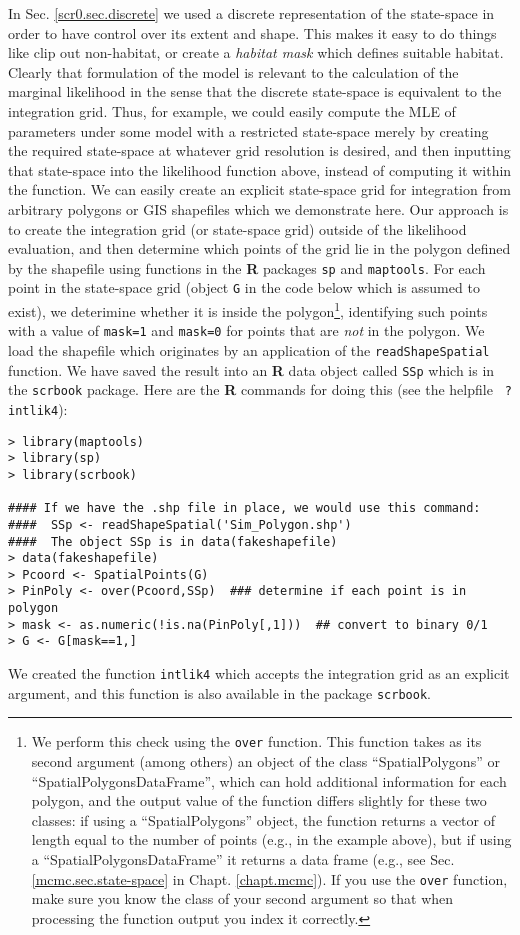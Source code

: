 In Sec. \ref{scr0.sec.discrete} we used a discrete representation of
the state-space in order to have control over its extent and
shape. This makes it easy to do things like clip out non-habitat, or
create a {\it habitat mask} which defines suitable habitat.  Clearly
that formulation of the model is relevant to the calculation of the
marginal likelihood in the sense that the discrete state-space is
equivalent to the integration grid.  Thus, for example, we could
easily compute the MLE of parameters under some model with a
restricted state-space merely by creating the required state-space at
whatever grid resolution is desired, and then inputting that
state-space into the likelihood function above, instead of computing
it within the function. We can easily create an explicit
state-space grid for integration from arbitrary polygons or GIS
shapefiles which we demonstrate here. Our approach
is to create the integration grid (or state-space grid) outside of the
likelihood evaluation, and then determine which points of the grid lie
in the polygon defined by the shapefile using functions in the {\bf R}
packages \mbox{\tt sp} and \mbox{\tt maptools}.  For each point in the
state-space grid (object \mbox{\tt G} in the code below which is
assumed to exist), we deterimine whether it is inside the
polygon\footnote{We perform this check using the {\tt over}
  function. This function takes as its second argument (among others)
  an object of the class ``SpatialPolygons'' or
  ``SpatialPolygonsDataFrame'', which can hold additional information
  for each polygon, and the output value of the function differs
  slightly for these two classes: if using a ``SpatialPolygons''
  object, the function returns a vector of length equal to the number
  of points (e.g., in the example above), but if using a
  ``SpatialPolygonsDataFrame'' it returns a data frame
  (e.g., see Sec. \ref{mcmc.sec.state-space} in
  Chapt. \ref{chapt.mcmc}). If you use the {\tt over} function, make
  sure you know the class of your second argument so that when
  processing the function output you index it correctly.}, identifying
such points with a value of \mbox{\tt mask=1} and \mbox{\tt mask=0}
for points that are {\it not} in the polygon.  We load the shapefile
which originates by an application of the \mbox{\tt readShapeSpatial}
function. We have saved the result into an {\bf R} data object called
\mbox{\tt SSp} which is in the \mbox{\tt scrbook} package.  Here are
the {\bf R} commands for doing this (see the helpfile \mbox{\tt
  ?intlik4}): {\small
\begin{verbatim}
> library(maptools)
> library(sp)
> library(scrbook)

#### If we have the .shp file in place, we would use this command:
####  SSp <- readShapeSpatial('Sim_Polygon.shp')
####  The object SSp is in data(fakeshapefile) 
> data(fakeshapefile)  
> Pcoord <- SpatialPoints(G)
> PinPoly <- over(Pcoord,SSp)  ### determine if each point is in polygon
> mask <- as.numeric(!is.na(PinPoly[,1]))  ## convert to binary 0/1
> G <- G[mask==1,]
\end{verbatim}
}
{\flushleft We} created  the function \mbox{\tt intlik4} which accepts the integration
grid as an explicit argument, and this function is also available in
the package  \mbox{\tt scrbook}.

